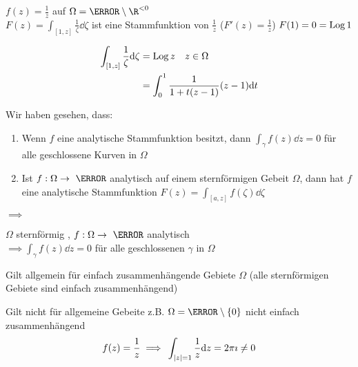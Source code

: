 \begin{bsp*}
	$f(z) = \frac{1}{z}$ auf $\Omega = \C \setminus \R^{<0}$ \\
	$F(z) = \int_{[1,z]} \frac{1}{\zeta} \dd \zeta$ ist eine Stammfunktion von $\frac{1}{z}$ ($F'(z) = \frac{1}{z}$) $F(1) = 0 = \operatorname{Log} 1$
	\begin{folge}[head = Es folgt , note = (Alternative Definition von $\Log$)]
		\[ \begin{split}
			\int_{[1,z]} \frac{1}{\zeta} \dd \zeta
				&= \operatorname{Log} z \quad z \in \Omega \\
				&= \int_0^1 \frac{1}{1 + t(z-1)} (z-1) \dd t
		\end{split} \]
	\end{folge}
\end{bsp*}
Wir haben gesehen, dass:
\begin{enumerate}[label = \arabic*)]
	\item Wenn $f$ eine analytische Stammfunktion besitzt, dann $\int_\gamma f(z) \dd z = 0$ für alle geschlossene Kurven in $\Omega$
	\item Ist $f: \Omega \rightarrow \C$ analytisch auf einem sternförmigen Gebeit $\Omega$, dann hat $f$ eine analytische Stammfunktion $F(z) = \int_{[a,z]} f(\zeta) \dd \zeta$
\end{enumerate}
$\implies$
\begin{satz*}[note = Satz von Cauchy für sternförmige Gebiete , index = Satz von Cauchy für sternförmige Gebiete , indexformat = {1!~23456 3!12~456}]
	$\Omega$ sternförmig , $f: \Omega \rightarrow \C$ analytisch \\
	$\implies \int_\gamma f(z) \dd z = 0$ für alle geschlossenen $\gamma$ in $\Omega$
\end{satz*}
\begin{bem}[note = zu Satz von Cauchy]
	Gilt allgemein für einfach zusammenhängende Gebiete $\Omega$ (alle sternförmigen Gebiete sind einfach zusammenhängend)
\end{bem}
\begin{bem}[note = zu Satz von Cauchy]
	Gilt nicht für allgemeine Gebeite z.B. $\Omega = \C \setminus \{ 0 \}$ nicht einfach zusammenhängend
	\[ f(z) = \frac{1}{z} \implies \int_{\abs{z}=1} \frac{1}{z} \dd z = 2\pi\imath \neq 0 \]
\end{bem}
